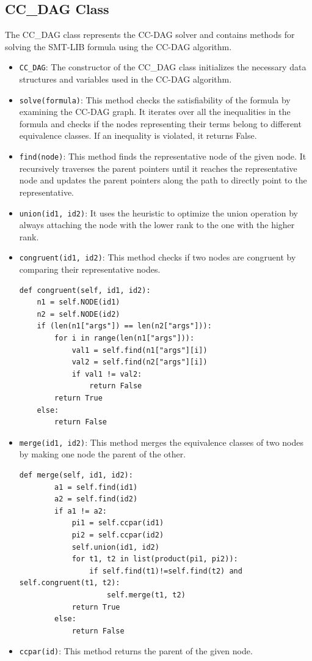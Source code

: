 \documentclass[11pt]{report}
\begin{document}
\subsection*{CC\_DAG Class}
The CC\_DAG class represents the CC-DAG solver and contains methods for solving the SMT-LIB formula using the CC-DAG algorithm.
\begin{itemize}
    \item \texttt{CC\_DAG}: The constructor of the CC\_DAG class initializes the necessary data structures and variables used in the CC-DAG algorithm.

    
    \item \texttt{solve(formula)}: This method checks the satisfiability of the formula by examining the CC-DAG graph. It iterates over all the inequalities in the formula and checks if the nodes representing their terms belong to different equivalence classes. If an inequality is violated, it returns False.
    
    \item \texttt{find(node)}: This method finds the representative node of the given node. It recursively traverses the parent pointers until it reaches the representative node and updates the parent pointers along the path to directly point to the representative.
    
    
    \item \texttt{union(id1, id2)}: It uses the heuristic to optimize the union operation by always attaching the node with the lower rank to the one with the higher rank.
    
    \item \texttt{congruent(id1, id2)}: This method checks if two nodes are congruent by comparing their representative nodes.
    \begin{lstlisting}[style=pythoncode]
    def congruent(self, id1, id2):
    n1 = self.NODE(id1)
    n2 = self.NODE(id2)
    if (len(n1["args"]) == len(n2["args"])):
        for i in range(len(n1["args"])):
            val1 = self.find(n1["args"][i])
            val2 = self.find(n2["args"][i])
            if val1 != val2:
                return False
        return True
    else:
        return False
    \end{lstlisting}
    
    \item \texttt{merge(id1, id2)}: This method merges the equivalence classes of two nodes by making one node the parent of the other. 
    
    \begin{lstlisting}[style=pythoncode]
    def merge(self, id1, id2):
        a1 = self.find(id1)
        a2 = self.find(id2)
        if a1 != a2:
            pi1 = self.ccpar(id1)
            pi2 = self.ccpar(id2)
            self.union(id1, id2)
            for t1, t2 in list(product(pi1, pi2)):
                if self.find(t1)!=self.find(t2) and self.congruent(t1, t2):
                    self.merge(t1, t2)
            return True
        else:
            return False
    \end{lstlisting}
    
    \item \texttt{ccpar(id)}: This method returns the parent of the given node.

\end{itemize}
\end{document}
